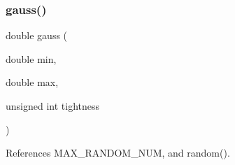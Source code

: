\subsubsection{\texorpdfstring{gauss()}{gauss()}}
{\footnotesize\ttfamily double gauss (\begin{DoxyParamCaption}\item[{double}]{min,  }\item[{double}]{max,  }\item[{unsigned int}]{tightness }\end{DoxyParamCaption})}



References M\+A\+X\+\_\+\+R\+A\+N\+D\+O\+M\+\_\+\+N\+UM, and random().

